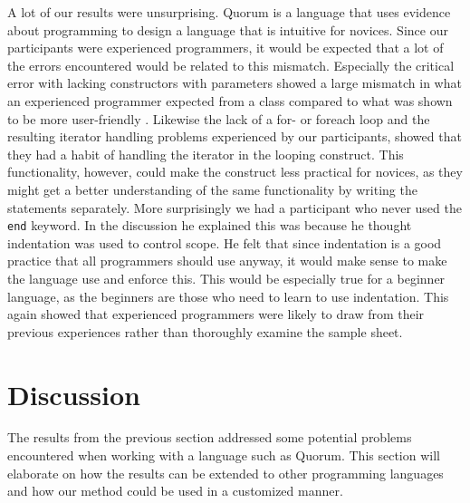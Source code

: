 \documentclass[preprint,10pt]{sigplanconf}
\begin{document}
A lot of our results were unsurprising.
Quorum is a language that uses evidence about programming to design a language that is intuitive for novices.
Since our participants were experienced programmers, it would be expected that a lot of the errors encountered would be related to this mismatch.
Especially the critical error with lacking constructors with parameters showed a large mismatch in what an experienced programmer expected from a class compared to what was shown to be more user-friendly \cite{ParamConstructors}.
Likewise the lack of a for- or foreach loop and the resulting iterator handling problems experienced by our participants, showed that they had a habit of handling the iterator in the looping construct.
This functionality, however, could make the construct less practical for novices, as they might get a better understanding of the same functionality by writing the statements separately.
More surprisingly we had a participant who never used the \lstinline!end! keyword.
In the discussion he explained this was because he thought indentation was used to control scope.
He felt that since indentation is a good practice that all programmers should use anyway, it would make sense to make the language use and enforce this.
This would be especially true for a beginner language, as the beginners are those who need to learn to use indentation.
This again showed that experienced programmers were likely to draw from their previous experiences rather than thoroughly examine the sample sheet.

\section{Discussion}
The results from the previous section addressed some potential problems encountered when working with a language such as Quorum. This section will elaborate on how the results can be extended to other programming languages and how our method could be used in a customized manner.
\end{document}
